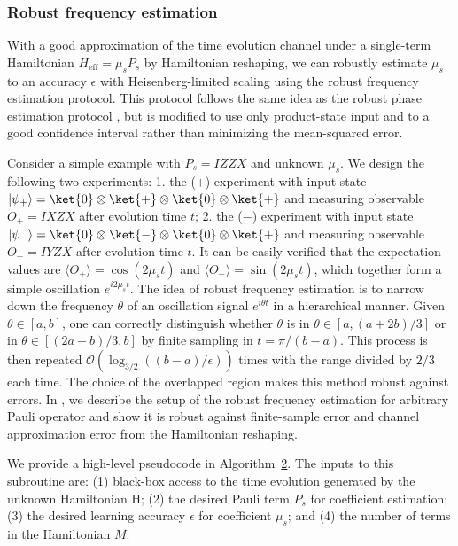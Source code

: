 \documentclass[twocolumn,superscriptaddress,aps,showpacs,amsmath,amstex,amssymb,citeautoscript,floatfix,pra,preprintnumbers]{revtex4-2}
\newcounter{alg}
\theoremstyle{plain}
\theoremstyle{plain}
\theoremstyle{plain}
\theoremstyle{plain}
\theoremstyle{plain}
\theoremstyle{plain}
\begin{document}
\subsubsection{Robust frequency estimation}

With a good approximation of the time evolution channel under a single-term Hamiltonian $H_{\mathrm{eff}} = \mu_sP_s$ by Hamiltonian reshaping, we can robustly estimate $\mu_s$ to an accuracy $\epsilon$ with Heisenberg-limited scaling using the robust frequency estimation protocol. This protocol follows the same idea as the robust phase estimation protocol \cite{KimmelLowYoder2015robust}, but is modified to use only product-state input and to a good confidence interval rather than minimizing the mean-squared error. 

Consider a simple example with $P_s=IZZX$ and unknown $\mu_s$. We design the following two experiments: 1. the ($+$) experiment with input state $|\psi_{+}\rangle= \ket{0}\otimes\ket{+}\otimes \ket{0}\otimes\ket{+}$ and measuring observable $O_{+}=IXZX$ after evolution time $t$; 2. the ($-$) experiment with input state $|\psi_{-}\rangle=\ket{0}\otimes\ket{-}\otimes \ket{0}\otimes\ket{+}$ and measuring observable $O_{-}=IYZX$ after evolution time $t$. It can be easily verified that the expectation values are $\langle O_{+}\rangle=\cos(2\mu_s t)$ and $\langle O_{-}\rangle=\sin(2\mu_s t)$, which together form a simple oscillation $e^{i2\mu_st}$. The idea of robust frequency estimation is to narrow down the frequency $\theta$ of an oscillation signal $e^{i\theta t}$ in a hierarchical manner. Given $\theta\in [a,b]$, one can correctly distinguish whether $\theta$ is in $\theta\in[a,(a+2b)/3]$ or in $\theta\in [(2a+b)/3,b]$ by finite sampling in $t=\pi/(b-a)$. This process is then repeated $\mathcal{O}\left(\log_{3/2}((b-a)/\epsilon)
\right)$ times with the range divided by $2/3$ each time. 
The choice of the overlapped region makes this method robust against errors. 
In , we describe the setup of the robust frequency estimation for arbitrary Pauli operator and show it is robust against finite-sample error and channel approximation error from the Hamiltonian reshaping. 

We provide a high-level pseudocode in Algorithm~\hyperref[alg:algorithm_II]{2}. The inputs to this subroutine are: (1) black-box access to the time evolution generated by the unknown Hamiltonian H; (2) the desired Pauli term $P_s$ for coefficient estimation; (3) the desired learning accuracy $\epsilon$ for coefficient $\mu_s$; and (4) the number of terms in the Hamiltonian $M$.
\end{document}
